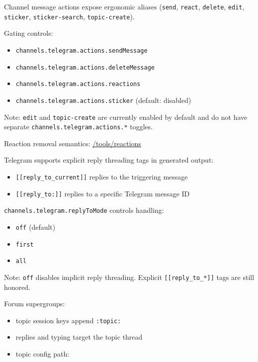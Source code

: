 Channel message actions expose ergonomic aliases (\texttt{send}, \texttt{react}, \texttt{delete}, \texttt{edit}, \texttt{sticker}, \texttt{sticker-search}, \texttt{topic-create}).

Gating controls:

\begin{itemize}
  \item \texttt{channels.telegram.actions.sendMessage}
  \item \texttt{channels.telegram.actions.deleteMessage}
  \item \texttt{channels.telegram.actions.reactions}
  \item \texttt{channels.telegram.actions.sticker} (default: disabled)
\end{itemize}


Note: \texttt{edit} and \texttt{topic-create} are currently enabled by default and do not have separate \texttt{channels.telegram.actions.*} toggles.

Reaction removal semantics: \href{/tools/reactions}{/tools/reactions}


Telegram supports explicit reply threading tags in generated output:

\begin{itemize}
  \item \texttt{[[reply\_to\_current]]} replies to the triggering message
  \item \texttt{[[reply\_to:]]} replies to a specific Telegram message ID
\end{itemize}


\texttt{channels.telegram.replyToMode} controls handling:

\begin{itemize}
  \item \texttt{off} (default)
  \item \texttt{first}
  \item \texttt{all}
\end{itemize}


Note: \texttt{off} disables implicit reply threading. Explicit \texttt{[[reply\_to\_*]]} tags are still honored.


Forum supergroups:

\begin{itemize}
  \item topic session keys append \texttt{:topic:}
  \item replies and typing target the topic thread
  \item topic config path:
\end{itemize}

